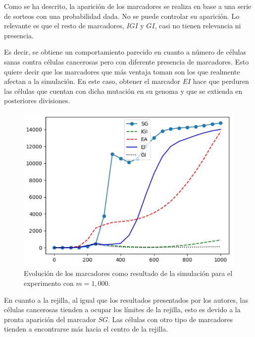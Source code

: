Como se ha descrito, la aparición de los marcadores se realiza en base a una serie de sorteos con una probabilidad dada.
No se puede controlar su aparición. Lo relevante es que el resto de marcadores, $IGI$ y $GI$, casi no tienen relevancia
ni presencia.

Es decir, se obtiene un comportamiento parecido en cuanto a número de células sanas contra células cancerosas pero
con diferente presencia de marcadores. Esto quiere decir que los marcadores que más ventaja toman son los que realmente
afectan a la simulación. En este caso, obtener el marcador $EI$ hace que perduren las células que cuentan con dicha
mutación en su genoma y que se extienda en posteriores divisiones.

\begin{figure}[h]
\centering
\includegraphics[scale=0.8]{figures/experiments/exp2/mutations}
\caption{Evolución de los marcadores como resultado de la simulación para el experimento con $m = 1,000$.}
\end{figure}

En cuanto a la rejilla, al igual que los resultados presentados por los autores, las células cancerosas
tienden a ocupar los límites de la rejilla, esto es devido a la pronta aparición del marcador $SG$. Las células con
otro tipo de marcadores tienden a encontrarse más hacia el centro de la rejilla.

